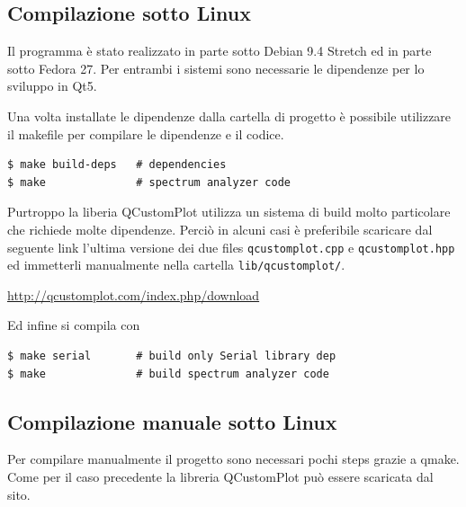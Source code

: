 \subsection{Compilazione sotto Linux}
Il programma \`e stato realizzato in parte sotto Debian 9.4 Stretch ed in
parte sotto Fedora 27. Per entrambi i sistemi sono necessarie le dipendenze
per lo sviluppo in Qt5.

\noindent Una volta installate le dipendenze dalla cartella di progetto \`e
possibile utilizzare il makefile per compilare le dipendenze e il codice.
\begin{Verbatim}[frame=single]
$ make build-deps   # dependencies
$ make              # spectrum analyzer code 
\end{Verbatim}
Purtroppo la liberia QCustomPlot utilizza un sistema di build molto
particolare che richiede molte dipendenze. Perci\`o in alcuni casi \`e
preferibile scaricare dal seguente link l'ultima versione dei due files
\texttt{qcustomplot.cpp} e \texttt{qcustomplot.hpp} ed immetterli manualmente
nella cartella \texttt{lib/qcustomplot/}.
\begin{center}
\url{http://qcustomplot.com/index.php/download}
\end{center}
Ed infine si compila con
\begin{Verbatim}[frame=single]
$ make serial       # build only Serial library dep
$ make              # build spectrum analyzer code 
\end{Verbatim}

\subsection{Compilazione manuale sotto Linux}
Per compilare manualmente il progetto sono necessari pochi steps grazie a
qmake. Come per il caso precedente la libreria QCustomPlot pu\`o essere
scaricata dal sito.

